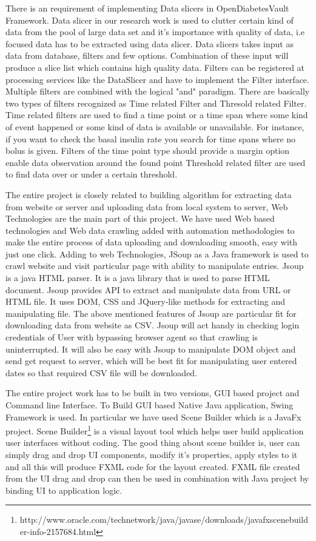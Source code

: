 \documentclass[article,type=msc,colorback,accentcolor=tud9c,twoside,11pt]{tudthesis}
\begin{document}
	There is an requirement of implementing Data slicers in OpenDiabetesVault Framework. Data slicer in our research work is used to clutter certain kind of data from the pool of large data set and  it's importance with quality of data, i.e focused data has to be extracted using data slicer. Data slicers takes input as data from database, filters and few options. Combination of these input will produce a slice list which contains high quality data. Filters can be registered at processing services like the DataSlicer and have to implement the Filter interface. Multiple filters are combined with the logical "and" paradigm. There are basically two types of filters recognized as Time related Filter and Thresold related Filter. Time related filters  are used to find a time point or a time span where some kind of event happened or some kind of data is available or unavailable. For instance, if you want to check the basal insulin rate you search for time spans where no bolus is given. Filters of the time point type should provide a margin option enable data observation around the found point Threshold related filter are used to find data over or under a certain threshold.
	
	The entire project is closely related to building algorithm for extracting data from website or server and uploading data from local system to server, Web Technologies are the main part of this project. We have used Web based technologies and Web data crawling added with automation methodologies to make the entire process of data uploading and downloading smooth, easy with just one click. Adding to web Technologies, JSoup\cite{Jsoup} as a Java framework is used to crawl website and visit particular page with ability to manipulate entries. Jsoup is a java HTML parser. It is a java library that is used to parse HTML\cite{BeaqleJSHTML} document. Jsoup provides API to extract and manipulate data from URL or HTML file. It uses DOM, CSS and JQuery-like methods for extracting and manipulating file. The above mentioned features of Jsoup are particular fit for downloading data from website as CSV. Jsoup will act handy in checking login credentials of User with bypassing browser agent so that crawling is uninterrupted. It will also be easy with Jsoup to manipulate DOM object and send get request to server, which will be best fit for manipulating user entered dates so that required CSV file will be downloaded. 
	
	The entire project work has to be built in two versions, GUI based project and Command line Interface. To Build GUI based Native Java application, Swing Framework is used. In particular we have used Scene Builder which is a JavaFx\cite{JavaFx} project. Scene Builder\footnote{http://www.oracle.com/technetwork/java/javase/downloads/javafxscenebuilder-info-2157684.html} is a visual layout tool which helps user build application user interfaces without coding. The good thing about scene builder is, user can simply drag and drop UI components, modify it's properties, apply styles to it and all this will produce FXML code for the layout created. FXML file created from the UI drag and drop can then be used in combination with Java project by binding UI to application logic. 
	
\end{document}
